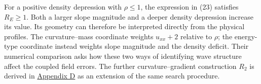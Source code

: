 For a positive density depression with \(\rho\leq1\), the expression in (23) satisfies \(R_E\geq1\). Both a larger slope magnitude and a deeper density depression increase its value. Its geometry can therefore be interpreted directly from the physical profiles. The curvature--mass coordinate weights \(u_{xx}+2\) relative to \(\rho\); the energy-type coordinate instead weights slope magnitude and the density deficit. Their numerical comparison asks how these two ways of identifying wave structure affect the coupled field errors. The further curvature--gradient construction \(R_2\) is derived in \hyperref[app:additional-density]{Appendix D} as an extension of the same search procedure.

